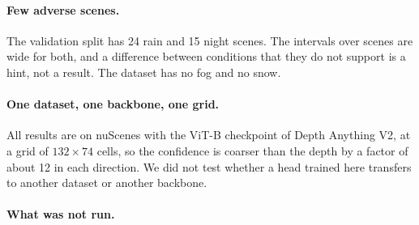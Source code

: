 \paragraph{Few adverse scenes.} The validation split has 24 rain and 15 night scenes. The intervals over scenes are wide for both, and a difference between conditions that they do not support is a hint, not a result. The dataset has no fog and no snow.

\paragraph{One dataset, one backbone, one grid.} All results are on nuScenes with the ViT-B checkpoint of Depth Anything V2, at a grid of $132 \times 74$ cells, so the confidence is coarser than the depth by a factor of about 12 in each direction. We did not test whether a head trained here transfers to another dataset or another backbone.

\paragraph{What was not run.} 
